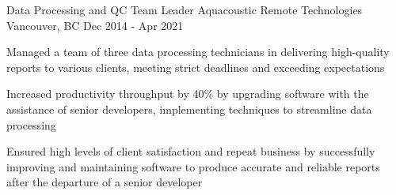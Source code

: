 \begin{cventries}
  \cventry
    {Data Processing and QC Team Leader} %
    {Aquacoustic Remote Technologies} %
    {Vancouver, BC} %
    {Dec 2014 - Apr 2021} %
    {
      \begin{cvitems} %
        \item{Managed a team of three data processing technicians in delivering high-quality reports to various clients, meeting strict deadlines and exceeding expectations}
        \item{Increased productivity throughput by 40\% by upgrading software with the assistance of senior developers, implementing techniques to streamline data processing}
        \item{Ensured high levels of client satisfaction and repeat business by successfully improving and maintaining software to produce accurate and reliable reports after the departure of a senior developer}
      \end{cvitems}
    }

\end{cventries}
